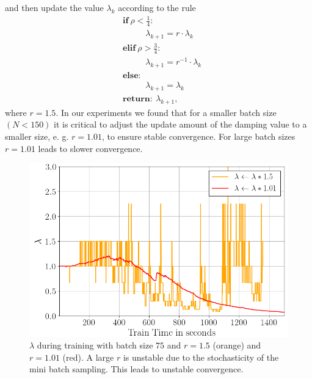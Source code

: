 \documentclass[conference]{IEEEtran}
\begin{document}
	and then update the value $\lambda_{k}$ according to the rule
	\begin{align}
	&\textbf{if}\:\rho<\frac{1}{4}:\\
	&\text{ }\text{ }\text{ }\text{ }\lambda_{k+1} = r\cdot\lambda_{k}\\
	&\textbf{elif}\:\rho>\frac{3}{4}:\\
	&\text{ }\text{ }\text{ }\text{ }\lambda_{k + 1} = r^{-1}\cdot\lambda_{k}\\
	&\textbf{else}: \\
	&\text{ }\text{ }\text{ }\text{ }\lambda_{k + 1} = \lambda_{k}\\
	&\textbf{return}:\:\lambda_{k + 1},
	\end{align}
	where $r=1.5$.
	In our experiments we found that for a smaller batch size $(N<150)$ it is critical to adjust the update amount of the damping value to a smaller size, e. g. $r=1.01$, to ensure stable convergence.
	For large batch sizes $r=1.01$ leads to slower convergence.
	
	\begin{figure}[htbp]
		\centerline{\includegraphics[scale=0.52]{lambda.png}}
		\caption{$\lambda$ during training with batch size $75$ and $r=1.5$ (orange) and $r=1.01$ (red). A large $r$ is unstable due to the stochasticity of the mini batch sampling. This leads to unstable convergence.}
		\label{fig}
	\end{figure}
	
\end{document}
